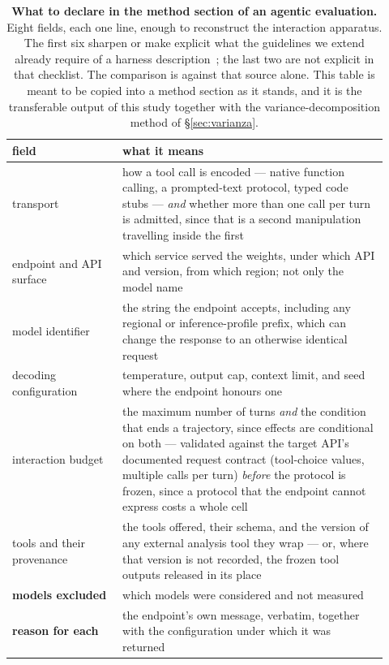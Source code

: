 \begin{table}[t]
\centering
\caption{\textbf{What to declare in the method section of an agentic evaluation.} Eight fields, each one
line, enough to reconstruct the interaction apparatus. The first six sharpen or make explicit what the
guidelines we extend already require of a harness description~\citep{baltes2026guidelines}; the last two
are not explicit in that checklist. The comparison is against that source alone. This table is meant to be copied into a method section as it stands, and it is the
transferable output of this study together with the variance-decomposition method of \S\ref{sec:varianza}.}
\label{tab:checklist}
\footnotesize
\setlength{\tabcolsep}{4pt}
\begin{tabular}{@{}P{0.27\linewidth}P{0.65\linewidth}@{}}
\toprule
field & what it means \\
\midrule
transport & how a tool call is encoded --- native function calling, a prompted-text protocol, typed code
  stubs --- \emph{and} whether more than one call per turn is admitted, since that is a second
  manipulation travelling inside the first \\
endpoint and API surface & which service served the weights, under which API and version, from which
  region; not only the model name \\
model identifier & the string the endpoint accepts, including any regional or inference-profile prefix,
  which can change the response to an otherwise identical request \\
decoding configuration & temperature, output cap, context limit, and seed where the endpoint honours one \\
interaction budget & the maximum number of turns \emph{and} the condition that ends a trajectory, since
  effects are conditional on both --- validated against the target API's documented request contract
  (tool-choice values, multiple calls per turn) \emph{before} the protocol is frozen, since a protocol
  that the endpoint cannot express costs a whole cell \\
tools and their provenance & the tools offered, their schema, and the version of any external analysis
  tool they wrap --- or, where that version is not recorded, the frozen tool outputs released in its place \\
\textbf{models excluded} & which models were considered and not measured \\
\textbf{reason for each} & the endpoint's own message, verbatim, together with the configuration under
  which it was returned \\
\bottomrule
\end{tabular}
\end{table}

